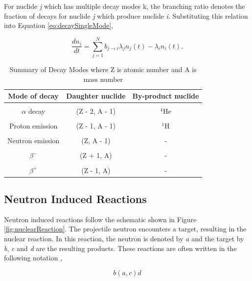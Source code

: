 \noindent For nuclide \textit{j} which has multiple decay modes k, the branching ratio denotes the fraction of decays for nuclide \textit{j} which produce nuclide \textit{i}. Substituting this relation into Equation \ref{eq:decaySingleMode},

\begin{equation}
    \frac{dn_{i}}{dt} = \sum_{j=1}^{N} b_{j\rightarrow i}\lambda_{j}n_{j}(t) -\lambda_{i} n_{i}(t).
    \label{eq:decay}
\end{equation}


\begin{table}[t]
    \caption{\label{tab:decayModes} Summary of Decay Modes where Z is atomic number and A is mass number \cite{pusaThesis}}
    \centering
    \begin{tabular}{c|c|c}
    \hline
    \textbf{Mode of decay} & \textbf{Daughter nuclide} & \textbf{By-product nuclide} \\ [0.5ex] 
    \hline
    \hline
    \\ [-1em]
    $\alpha$ decay & (Z - 2, A - 1) & ${}^{4}$He \\ \hline 
    \\ [-1em]
    Proton emission & (Z - 1, A - 1) & ${}^{1}$H \\ \hline
    \\ [-1em]
    Neutron emission & (Z, A - 1) & - \\ \hline
    \\ [-1em]
    $\beta^{-}$ & (Z + 1, A) & - \\ \hline
    \\ [-1em]
    $\beta^{+}$ & (Z - 1, A) & - \\ \hline
    \end{tabular}
\end{table}

\subsection{Neutron Induced Reactions}
Neutron induced reactions follow the schematic shown in Figure \ref{fig:nuclearReaction}.  The projectile neutron encounters a target, resulting in the nuclear reaction. In this reaction, the neutron is denoted by \textit{a} and the target by \textit{b}, \textit{c} and \textit{d} are the resulting products. These reactions are often written in the following notation \cite{duderstadt1976},

\begin{equation*}
    b (a,c) d 
\end{equation*}

